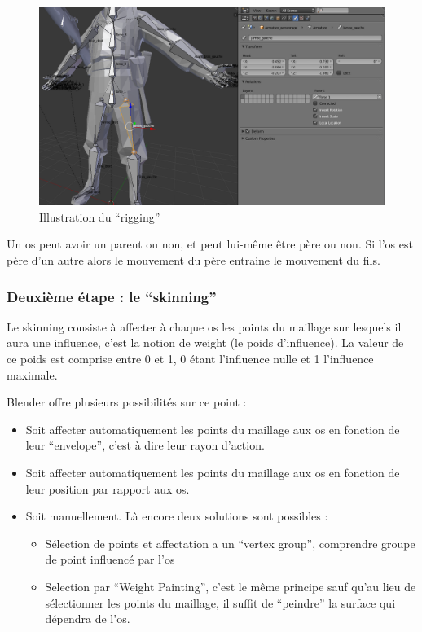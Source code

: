\documentclass[11pt]{report}
\begin{document}
\begin{figure}[htbp]
\centering
\includegraphics[scale=0.30]{rigging.png}
\caption{Illustration du ``rigging''}
\end{figure}

Un os peut avoir un parent ou non, et peut lui-même être père ou non. Si l’os est père d’un autre alors le mouvement du père entraine le mouvement du fils.

\subsubsection{Deuxième étape : le ``skinning''}

Le skinning consiste à affecter à chaque os les points du maillage sur lesquels il aura une influence, c’est la notion de weight (le poids d’influence). La valeur de ce poids est comprise entre 0 et 1, 0 étant l’influence nulle et 1 l’influence maximale.

Blender offre plusieurs possibilités sur ce point :

\begin{itemize}
\item Soit affecter automatiquement les points du maillage aux os en  fonction de leur ``envelope'', c’est à dire leur rayon d’action.
\item Soit affecter automatiquement les points du maillage aux os en  fonction de leur position par rapport aux os.
\item Soit manuellement. Là encore deux solutions sont possibles :
\begin{itemize}
	\item Sélection de points et affectation a un ``vertex group'', comprendre groupe de point influencé par l’os
	\item Selection par ``Weight Painting'', c’est le même principe sauf qu’au lieu de sélectionner les points du maillage, il suffit de ``peindre'' la surface qui dépendra de l’os.
\end{itemize}
\end{itemize}
\end{document}
